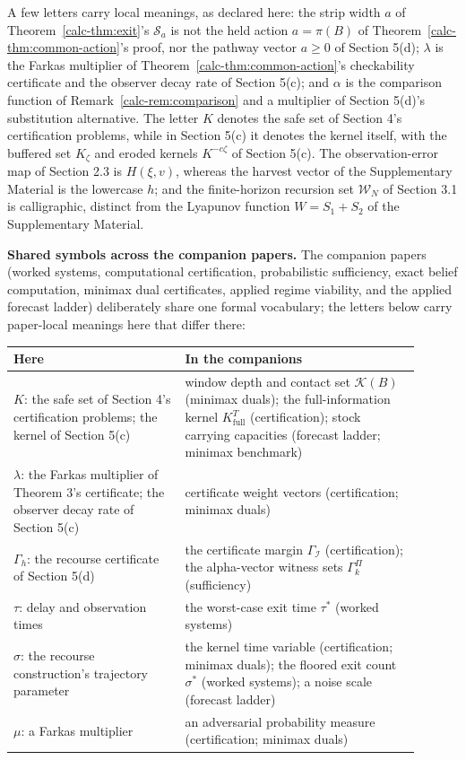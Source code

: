\documentclass[10pt,twocolumn]{article}
\theoremstyle{definition}
\begin{document}
A few letters carry local meanings, as declared here: the strip width \(a\) of
Theorem~\ref{calc-thm:exit}'s \(\mathcal{S}_a\) is not the held action
\(a = \pi(B)\) of Theorem~\ref{calc-thm:common-action}'s proof, nor the
pathway vector \(a \ge 0\) of Section 5(d); \(\lambda\) is the Farkas
multiplier of Theorem~\ref{calc-thm:common-action}'s checkability
certificate and the observer decay rate of Section 5(c); and
\(\alpha\) is the comparison function of Remark~\ref{calc-rem:comparison}
and a multiplier of Section 5(d)'s substitution alternative. The
letter \(K\) denotes the safe set of Section 4's certification
problems, while in Section 5(c) it denotes the kernel
itself, with the buffered set \(K_\zeta\) and eroded kernels
\(K^{-c\zeta}\) of Section 5(c). The observation-error map of
Section 2.3 is \(H(\xi, v)\), whereas the harvest vector of
the Supplementary Material is the lowercase \(h\); and the finite-horizon recursion
set \(\mathcal{W}_N\) of Section 3.1 is calligraphic, distinct from
the Lyapunov function \(W = S_1 + S_2\) of the Supplementary Material.

\medskip
\noindent\textbf{Shared symbols across the companion papers.} The
companion papers (worked systems, computational certification,
probabilistic sufficiency, exact belief computation, minimax dual
certificates, applied regime viability, and the applied forecast ladder)
deliberately share one formal vocabulary; the letters below carry
paper-local meanings here that differ there:
\begin{center}\small
\begin{tabular}{@{}p{0.38\linewidth}p{0.52\linewidth}@{}}
\toprule
\textbf{Here} & \textbf{In the companions} \\
\midrule
\(K\): the safe set of Section 4's certification problems; the kernel of Section 5(c) & window depth and contact set \(\mathcal{K}(B)\) (minimax duals); the full-information kernel \(K^{T}_{\mathrm{full}}\) (certification); stock carrying capacities (forecast ladder; minimax benchmark) \\
\(\lambda\): the Farkas multiplier of Theorem 3's certificate; the observer decay rate of Section 5(c) & certificate weight vectors (certification; minimax duals) \\
\(\Gamma_{h}\): the recourse certificate of Section 5(d) & the certificate margin \(\Gamma_{\mathcal{I}}\) (certification); the alpha-vector witness sets \(\Gamma^{\Pi}_{k}\) (sufficiency) \\
\(\tau\): delay and observation times & the worst-case exit time \(\tau^{*}\) (worked systems) \\
\(\sigma\): the recourse construction's trajectory parameter & the kernel time variable (certification; minimax duals); the floored exit count \(\sigma^{*}\) (worked systems); a noise scale (forecast ladder) \\
\(\mu\): a Farkas multiplier & an adversarial probability measure (certification; minimax duals) \\
\bottomrule
\end{tabular}
\end{center}
\end{document}
